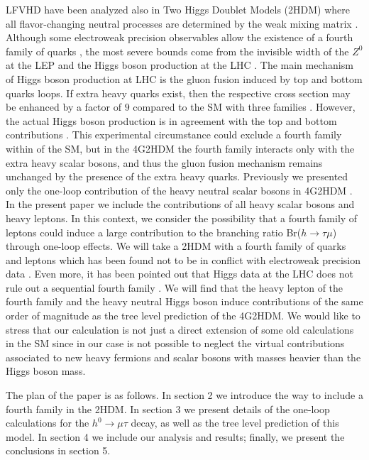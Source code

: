 \documentclass[a4paper]{jpconf}
\begin{document}
LFVHD have been analyzed also in Two Higgs Doublet Models (2HDM) where all flavor-changing neutral processes are determined by the weak mixing matrix \cite{Botella:2015hoa,Sher:2016rhh}. Although some electroweak precision observables  allow the existence of a fourth family of quarks \cite{PhysRevD.82.095006}, the most severe bounds come from the invisible width of the $Z^0$ at the LEP \cite{Olive:2016xmw} and the Higgs boson production at the LHC \cite{Eberhardt:2012ck,PhysRevLett.109.241802}. The main mechanism of Higgs boson production at LHC is the gluon fusion induced by top and bottom quarks loops. If extra heavy quarks exist, then the respective cross section may be enhanced by a factor of $ 9$ compared to the SM with three families \cite{PhysRevD.83.094018}. However, the actual Higgs boson production is in agreement with the top and bottom contributions \cite{Eberhardt:2012ck,PhysRevLett.109.241802}. This experimental circumstance could exclude a fourth family within of the SM, but in the 4G2HDM \cite{BarShalom:2011zj} the fourth family interacts only with the extra heavy scalar bosons, and thus the gluon fusion mechanism remains unchanged by the presence of the extra heavy quarks. Previously we presented only the one-loop contribution of the heavy neutral scalar bosons in 4G2HDM \cite{Moyotl2017205}. In the present paper we include the contributions of all heavy scalar bosons and heavy leptons. In this context, we consider the possibility that a fourth family of leptons could induce a large contribution to the branching ratio Br($h\to\tau\mu$) through one-loop effects. We will take a 2HDM with a fourth family of quarks and leptons which has been found not to be in conflict with electroweak precision data \cite{BarShalom:2011zj,PhysRevD.81.075023,Baak2012}. Even more, it has been pointed out that Higgs data at the LHC does not rule out a sequential fourth family \cite{Banerjee:2013hxa,Chen:2012wz,Das:2017mnu,BARSHALOM20171}. We will find that the heavy lepton of the fourth family and the heavy neutral Higgs boson induce contributions of the same order of magnitude as the tree level prediction of the 4G2HDM. We would like to stress that our calculation is not just a direct extension of some old calculations in the SM since in our case is not possible to neglect the virtual contributions associated to new heavy fermions and scalar bosons with masses heavier than the Higgs boson mass.

The plan of the paper is as follows. In section 2 we introduce the way to include a fourth family in the 2HDM. In section 3 we present details of the one-loop calculations for the $h^0\to \mu\tau$  decay, as well as the tree level prediction of this model. In section 4 we include our analysis and results; finally, we present the conclusions in section 5. 
\end{document}
